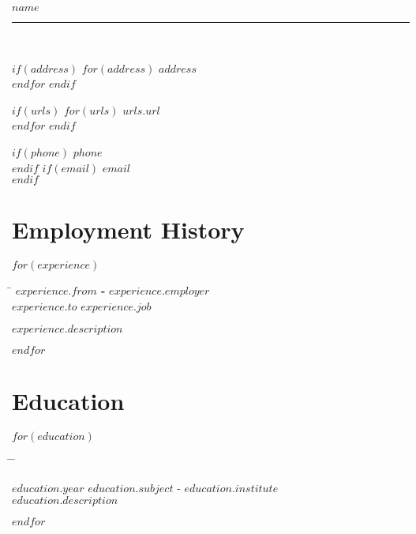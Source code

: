 \documentclass[10pt]{article} %
\newlength{\smallertextwidth}
\renewcommand{\title}[1]{
{\huge{ \color{slateblue}\textbf{#1} }}\\ %
\rule{\textwidth}{0.3mm}\\ %
}
\newcommand{\job}[6]{
\begin{tabbing}
\hspace{2cm} \= \kill
{\color{slateblue}\textbf{#1}} \> \href{#4}{#3} \\
{\color{slateblue}\textbf{#2}} \>\+ \textit{#5} \\
\begin{minipage}{\smallertextwidth}
\vspace{1mm}
#6
\end{minipage}
\end{tabbing}
\vspace{1mm}
}
\newcommand{\tabbedblock}[1]{
\begin{tabbing}
\hspace{2cm} \= \hspace{4cm} \= \kill
#1
\end{tabbing}
}
\begin{document}

\title{$name$} %

\vspace{-5mm}

\begin{multicols}{2}

$if(address)$
$for(address)$
$address$\\
$endfor$
$endif$

$if(urls)$
$for(urls)$
\href{$urls.url$}{$urls.url$}\\
$endfor$
$endif$

\columnbreak

$if(phone)$
$phone$\\
$endif$
$if(email)$
\href{mailto:$email$}{$email$}\\
$endif$
\end{multicols}


\vspace{-5mm}


\section{Employment History}
$for(experience)$
\job
{$experience.from$ -}{$experience.to$}
{$experience.employer$}
{$experience.url$}
{$experience.job$}
{$experience.description$}
$endfor$


\section{Education}
$for(education)$
\tabbedblock{
    {\color{slateblue}\bf{$education.year$}} \> $education.subject$ - \href{http://$education.url$}{$education.institute$} \\
\>\textit{$education.description$}
}
$endfor$
\end{document}
